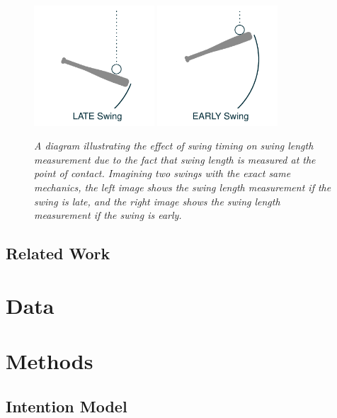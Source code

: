 \documentclass{article}
\begin{document}
    \begin{figure}
      \centering
      \includegraphics[width = 0.4\textwidth]{../../figures/swing_late.pdf}
      \includegraphics[width = 0.4\textwidth]{../../figures/swing_early.pdf}
      \caption{\it A diagram illustrating the effect of swing timing on swing length measurement due to the fact that swing length is measured at the point of contact. Imagining two swings with the exact same mechanics, the left image shows the swing length measurement if the swing is late, and the right image shows the swing length measurement if the swing is early.}
      \label{fig:swing-diagram}
    \end{figure}

    \subsection{Related Work}
    \label{sec:related-work}

  \section{Data}
  \label{sec:data}

  \section{Methods}
  \label{sec:methods}

    \subsection{Intention Model}
    \label{sec:methods-intention}
\end{document}
